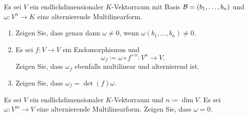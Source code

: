\documentclass[a4paper,10pt]{scrartcl}
\begin{document}


\begin{question}
  Es sei $V$ ein endlichdimensionaler $K$-Vektorraum mit Basis $\mathcal{B} = (b_1, \dotsc, b_n)$ und $\omega \colon V^n \to K$ eine alternierende Multilinearform.
  \begin{enumerate}
    \item
      Zeigen Sie, dass genau dann $\omega \neq 0$, wenn $\omega(b_1, \dotsc, b_n) \neq 0$.
    \item
      Es sei $f \colon V \to V$ ein Endomorphismus und
      \[
        \omega_f \coloneqq \omega \circ f^{\times n} \colon V^n \to V,
      \]
      Zeigen Sie, dass $\omega_f$ ebenfalls multilinear und alternierend ist.
    \item
      Zeigen Sie, dass $\omega_f = \det(f) \omega$.
  \end{enumerate}
\end{question}


\begin{question}
  Es sei $V$ ein endlichdimensionaler $K$-Vektorraum und $n \coloneqq \dim V$.
  Es sei $\omega \colon V^m \to V$ eine alternierende Multilinearform.
  Zeigen Sie, dass $\omega = 0$.
\end{question}
\end{document}

